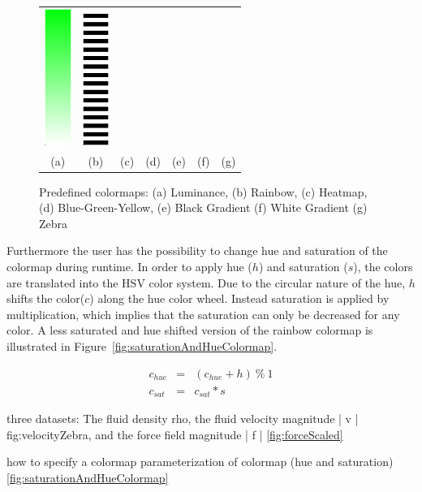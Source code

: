 \begin{figure}[htbp]
\begin{tabular}{ccccccc}
      \includegraphics[height=1.75in]{figures/colormaps/whiteGradient.png}&
      \includegraphics[height=1.75in]{figures/colormaps/zebra.png}\\
    (a)&(b)&(c)&(d)&(e)&(f)&(g)\\
    \end{tabular}
    \caption{Predefined colormaps: (a) Luminance, (b) Rainbow, (c) Heatmap, (d)  Blue-Green-Yellow, (e) Black Gradient (f) White Gradient (g) Zebra}
    \label{fig:colormaps}
\end{figure}


Furthermore the user has the possibility to change hue and saturation of the  colormap during runtime. In order to apply hue ($h$) and saturation ($s$), the colors are translated into the HSV color system. Due to the circular nature of the hue, $h$ shifts the color($c$) along the hue color wheel. Instead saturation is applied by multiplication, which implies that the saturation can only be decreased for any color. A less saturated and hue shifted version of the rainbow colormap is illustrated in Figure~\ref{fig:saturationAndHueColormap}.

\begin{eqnarray*}
c_{hue} &=&  (c_{hue} + h)~\%~1\\
c_{sat} &=& c_{sat} * s
\end{eqnarray*}

three datasets: The fluid density rho, the fluid velocity magnitude | v | fig:velocityZebra, and the force field magnitude | f | \ref{fig:forceScaled}


how to specify a colormap
parameterization of colormap (hue and saturation) \ref{fig:saturationAndHueColormap}

